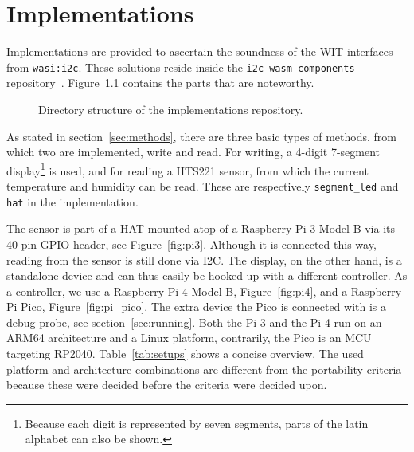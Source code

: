 \chapter{Implementations}
\label{chap:implementation}

Implementations are provided to ascertain the soundness of the \gls{WIT} interfaces from \texttt{wasi:i2c}. These solutions reside inside the \texttt{i2c-wasm-components} repository~\cite{gh:iwc}. Figure~\ref{fig:dirtree} contains the parts that are noteworthy.

\begin{figure}[h]
\caption{Directory structure of the implementations repository.}
\label{fig:dirtree}
\end{figure}

As stated in section~\ref{sec:methods}, there are three basic types of methods, from which two are implemented, write and read. For writing, a 4-digit 7-segment display\footnote{Because each digit is represented by seven segments, parts of the latin alphabet can also be shown.} is used, and for reading a HTS221 sensor, from which the current temperature and humidity can be read. These are respectively \texttt{segment\_led} and \texttt{hat} in the implementation.

The sensor is part of a \gls{HAT} mounted atop of a Raspberry Pi 3 Model B via its 40-pin GPIO header, see Figure~\ref{fig:pi3}. Although it is connected this way, reading from the sensor is still done via \gls{I2C}. The display, on the other hand, is a standalone device and can thus easily be hooked up with a different controller. As a controller, we use a Raspberry Pi 4 Model B, Figure~\ref{fig:pi4}, and a Raspberry Pi Pico, Figure~\ref{fig:pi_pico}. The extra device the Pico is connected with is a debug probe, see section~\ref{sec:running}. Both the Pi 3 and the Pi 4 run on an ARM64 architecture and a Linux platform, contrarily, the Pico is an \gls{MCU} targeting RP2040. Table~\ref{tab:setups} shows a concise overview.
The used platform and architecture combinations are different from the portability criteria because these were decided before the criteria were decided upon.

